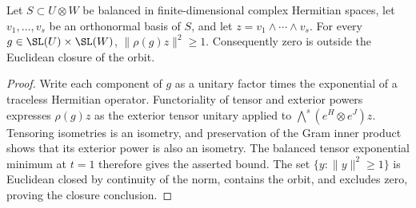 \begin{lemma}
\label{lem:balanced-plucker-orbit-norm}
\leanok
{}
Let $S\subset U\otimes W$ be balanced in finite-dimensional complex
Hermitian spaces, let $v_1,\ldots,v_s$ be an orthonormal basis of $S$,
and let $z=v_1\wedge\cdots\wedge v_s$. For every
$g\in\SL(U)\times\SL(W)$, $\|\rho(g)z\|^2\geq1$.
Consequently zero is outside the Euclidean closure of the orbit.
\end{lemma}
\begin{proof}
Write each component of $g$ as a unitary factor times the exponential
of a traceless Hermitian operator. Functoriality of tensor and exterior
powers expresses $\rho(g)z$ as the exterior tensor unitary applied to
$\bigwedge^s(e^H\otimes e^J)z$. Tensoring isometries is an isometry,
and preservation of the Gram inner product shows that its exterior power
is also an isometry. The balanced tensor exponential minimum at $t=1$
therefore gives the asserted bound. The set $\{y:\|y\|^2\geq1\}$ is
Euclidean closed by continuity of the norm, contains the orbit, and
excludes zero, proving the closure conclusion.
\end{proof}

